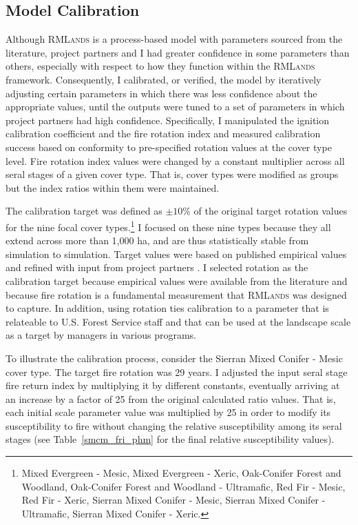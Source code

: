 \subsection{Model Calibration}
Although \textsc{RMLands} is a process-based model with parameters sourced from the literature, project partners and I had greater confidence in some parameters than others, especially with respect to how they function within the \textsc{RMLands} framework. Consequently, I calibrated, or verified, the model by iteratively adjusting certain parameters in which there was less confidence about the appropriate values, until the outputs were tuned to a set of parameters in which project partners had high confidence. Specifically, I manipulated the ignition calibration coefficient and the fire rotation index and measured calibration success based on conformity to pre-specified rotation values at the cover type level. Fire rotation index values were changed by a constant multiplier across all seral stages of a given cover type. That is, cover types were modified as groups but the index ratios within them were maintained. 

The calibration target was defined as $\pm 10$\% of the original target rotation values for the nine focal cover types.\footnote{Mixed Evergreen - Mesic, Mixed Evergreen - Xeric, Oak-Conifer Forest and Woodland, Oak-Conifer Forest and Woodland - Ultramafic, Red Fir - Mesic, Red Fir - Xeric, Sierran Mixed Conifer - Mesic, Sierran Mixed Conifer - Ultramafic, Sierran Mixed Conifer - Xeric.} I focused on these nine types because they all extend across more than 1,000 ha, and are thus statistically stable from simulation to simulation. Target values were based on published empirical values and refined with input from project partners \citep{Landfire2007,Mallek2013}. I selected rotation as the calibration target because empirical values were available from the literature and because fire rotation is a fundamental measurement that \textsc{RMLands} was designed to capture. In addition, using rotation ties calibration to a parameter that is relateable to U.S. Forest Service staff and that can be used at the landscape scale as a target by managers in various programs. 

To illustrate the calibration process, consider the Sierran Mixed Conifer - Mesic cover type. The target fire rotation was 29 years. I adjusted the input seral stage fire return index by multiplying it by different constants, eventually arriving at an increase by a factor of 25 from the original calculated ratio values. That is, each initial scale parameter value was multiplied by 25 in order to modify its susceptibility to fire without changing the relative susceptibility among its seral stages (see Table~\ref{smcm_fri_phm} for the final relative susceptibility values). 


